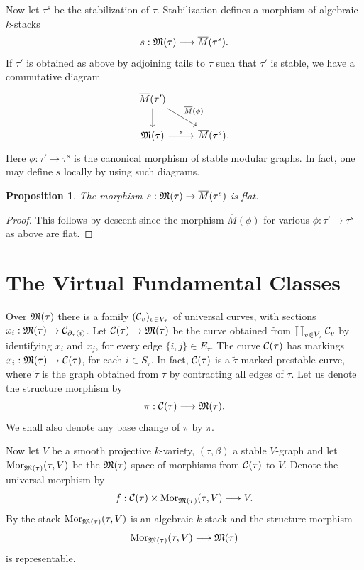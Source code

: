 \documentclass{article}
\newtheorem{prop}{Proposition}
\renewcommand{\tilde}{\widetilde}
\newcommand{\MM}{{\frak M}}
\newcommand{\cC}{{\cal C}}
\newcommand{\del}{\partial}
\newcommand{\Mor}{\mathop{\rm Mor}\nolimits}
\newcommand{\ol}{\overline}
\newcommand{\ldiag}[1]%
       {\makebox[0cm]{${\scriptstyle#1}\downarrow\phantom{\scriptstyle#1}$}}
\newcommand{\sediagr}[1]%
       {\makebox[0cm]{$\phantom{\scriptstyle#1}\searrow{\scriptstyle#1}$}}
\newcommand{\inversecomtri}[6]{%
\begin{array}{ccc}
#1           &                                &            \\
\ldiag{#2}   & \sediagr{#3}                   &            \\
#4           & \stackrel{#5}{\longrightarrow} & #6
\end{array}}
\renewcommand{\t}{_{\tau}}
\begin{document}
Now let $\tau^s$ be the stabilization of $\tau$. Stabilization defines
a morphism of algebraic $k$-stacks
$$s:\MM(\tau)\longrightarrow\ol{M}(\tau^s).$$
If $\tau'$ is obtained as above by adjoining tails to $\tau$ such that
$\tau'$ is stable, we have a commutative diagram
\[\begin{tikzcd}
  \ol{M}(\tau') \dar \drar["\ol{M}(\phi)"] \\
  \MM(\tau) \rar["s"] & \ol{M}(\tau^s).
\end{tikzcd}\]
Here $\phi:\tau'\to\tau^s$ is the canonical morphism of stable modular
graphs. In fact, one may define $s$ locally by using such diagrams.
\begin{prop}
The morphism $s:\MM(\tau)\rightarrow \ol{M}(\tau^s)$ is flat.
\end{prop}
\begin{proof}
This follows by descent since the morphism $\ol{M}(\phi)$ for various
$\phi:\tau'\rightarrow \tau^s$ as above are flat.
\end{proof}

\section{The Virtual Fundamental Classes}

Over $\MM(\tau)$ there is a family $(\cC_v)_{v\in V_{\tau}}$ of universal
curves, with sections
$x_i:\MM(\tau)\rightarrow\cC_{\del\t(i)}$. Let $\cC(\tau)\rightarrow\MM(\tau)$
be the curve obtained from $\coprod_{v\in V\t}\cC_v$ by identifying $x_i$ and
$x_j$, for every edge $\{i,j\}\in E\t$. The curve $\cC(\tau)$ has markings
$x_i:\MM(\tau)\rightarrow\cC(\tau)$, for each $i\in S\t$. In fact,
$\cC(\tau)$ is a $\tilde{\tau}$-marked prestable curve, where $\tilde{\tau}$ is
the graph obtained from $\tau$ by contracting all edges of $\tau$. Let us
denote
the structure morphism by
\[\pi:\cC(\tau)\longrightarrow\MM(\tau).\] We shall also denote any base change
of $\pi$ by $\pi$.

Now let $V$ be a smooth projective $k$-variety, $(\tau,\beta)$ a stable
$V$-graph and let
$\Mor_{\MM(\tau)}(\tau,V)$ be the $\MM(\tau)$-space of morphisms
{}from $\cC(\tau)$ to
$V$. Denote the universal morphism by
\[f:\cC(\tau)\times\Mor_{\MM(\tau)}(\tau,V)\longrightarrow V.\] By
\cite{fgaIV} the stack $\Mor_{\MM(\tau)}(\tau,V)$ is an algebraic
$k$-stack and the
structure morphism
\[\Mor_{\MM(\tau)}(\tau,V)\longrightarrow \MM(\tau)\] is
representable.
\end{document}
